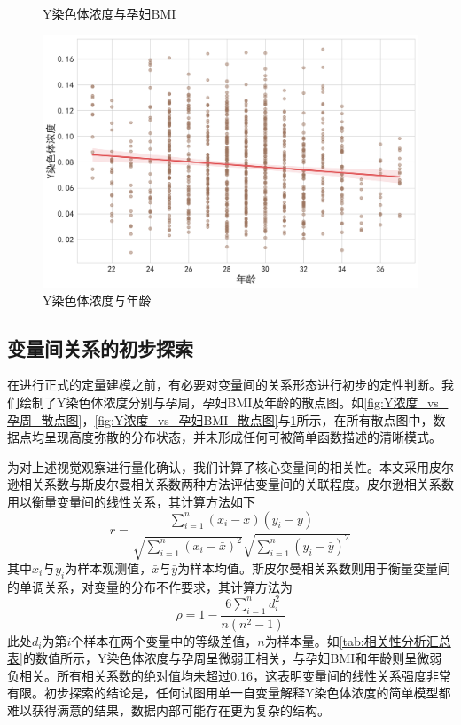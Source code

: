\begin{figure}[h!]
\begin{minipage}[b]{0.48\textwidth}
		\caption{Y染色体浓度与孕妇BMI}
		\label{fig:Y浓度_vs_孕妇BMI_散点图}
	\end{minipage}
	\hfill
	\begin{minipage}[b]{0.48\textwidth}
		\centering
		\includegraphics[width=\textwidth]{figs/3问题一/图5_Y浓度_vs_年龄_散点图.png}
		\caption{Y染色体浓度与年龄}
		\label{fig:Y浓度_vs_年龄_散点图}
	\end{minipage}
\end{figure}


\subsection{变量间关系的初步探索}
在进行正式的定量建模之前，有必要对变量间的关系形态进行初步的定性判断。我们绘制了Y染色体浓度分别与孕周，孕妇BMI及年龄的散点图。如\cref{fig:Y浓度_vs_孕周_散点图}，\cref{fig:Y浓度_vs_孕妇BMI_散点图}与\cref{fig:Y浓度_vs_年龄_散点图}所示，在所有散点图中，数据点均呈现高度弥散的分布状态，并未形成任何可被简单函数描述的清晰模式。


为对上述视觉观察进行量化确认，我们计算了核心变量间的相关性。本文采用皮尔逊相关系数与斯皮尔曼相关系数两种方法评估变量间的关联程度。皮尔逊相关系数用以衡量变量间的线性关系，其计算方法如下
\begin{equation}
	r = \frac{\sum_{i=1}^{n}(x_i - \bar{x})(y_i - \bar{y})}{\sqrt{\sum_{i=1}^{n}(x_i - \bar{x})^2} \sqrt{\sum_{i=1}^{n}(y_i - \bar{y})^2}}
\end{equation}
其中$x_i$与$y_i$为样本观测值，$\bar{x}$与$\bar{y}$为样本均值。斯皮尔曼相关系数则用于衡量变量间的单调关系，对变量的分布不作要求，其计算方法为
\begin{equation}
	\rho = 1 - \frac{6 \sum_{i=1}^{n} d_i^2}{n(n^2 - 1)}
\end{equation}
此处$d_i$为第$i$个样本在两个变量中的等级差值，$n$为样本量。如\cref{tab:相关性分析汇总表}的数值所示，Y染色体浓度与孕周呈微弱正相关，与孕妇BMI和年龄则呈微弱负相关。所有相关系数的绝对值均未超过0.16，这表明变量间的线性关系强度非常有限。初步探索的结论是，任何试图用单一自变量解释Y染色体浓度的简单模型都难以获得满意的结果，数据内部可能存在更为复杂的结构。

